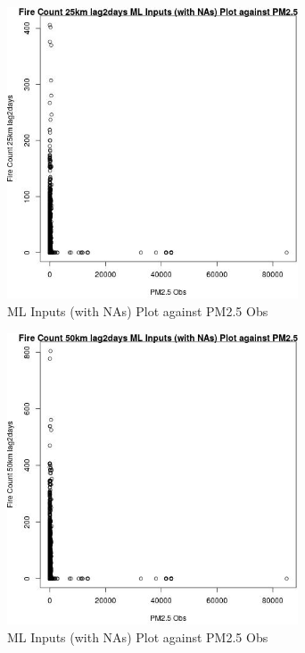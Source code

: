 \begin{figure} 
\centering  
\includegraphics[width=0.77\textwidth]{Code_Outputs/Report_ML_input_PM25_Step4_part_f_de_duplicated_aves_prioritize_24hr_obswNAs_Fire_Count_25km_lag2daysvPM25_Obs.jpg} 
\caption{\label{fig:Report_ML_input_PM25_Step4_part_f_de_duplicated_aves_prioritize_24hr_obswNAsFire_Count_25km_lag2daysvPM25_Obs}ML Inputs (with NAs) Plot against PM2.5 Obs} 
\end{figure} 
 

\clearpage 

\begin{figure} 
\centering  
\includegraphics[width=0.77\textwidth]{Code_Outputs/Report_ML_input_PM25_Step4_part_f_de_duplicated_aves_prioritize_24hr_obswNAs_Fire_Count_50km_lag2daysvPM25_Obs.jpg} 
\caption{\label{fig:Report_ML_input_PM25_Step4_part_f_de_duplicated_aves_prioritize_24hr_obswNAsFire_Count_50km_lag2daysvPM25_Obs}ML Inputs (with NAs) Plot against PM2.5 Obs} 
\end{figure} 
 

